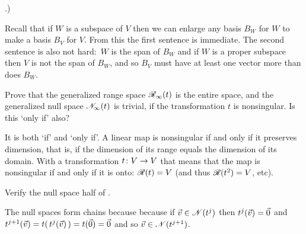 \begin{exercises}
{             .)}
    \begin{answer}
      Recall that if $W$ is a subspace of $V$ then we can enlarge
      any basis $B_W$ for $W$
      to make a basis $B_V$ for $V$.
      From this the first sentence is immediate.
      The second sentence is also not hard:~$W$ is the span of $B_W$ and
      if $W$ is a proper subspace then $V$ is not the span of $B_W$, and
      so $B_V$ must have at least one vector more than does $B_W$.     
    \end{answer}
  \recommended\item 
    Prove that the generalized range space $\mathscr{R}_\infty(t)$ is the
    entire space, and the generalized null space $\mathscr{N}_\infty(t)$ is trivial,
    if the transformation $t$ is nonsingular.
    Is this `only if' also?
    \begin{answer}
      It is both `if' and `only if'.
      A linear map is nonsingular
      if and only if it preserves dimension, that is, if the dimension of 
      its range equals the dimension of its domain.
      With a transformation $\mbox{$t\colon V\to V$}$ that means that 
      the map is nonsingular if and only if it is onto:
      $\mathscr{R}(t)=V$ (and thus $\mathscr{R}(t^2)=V$, etc).
    \end{answer}
  \item \label{exer:RangeAndNullChains} 
    Verify the null space half of .
    \begin{answer}
      The null spaces form chains because
      because if $\vec{v}\in\mathscr{N}(t^j)$ then $t^j(\vec{v})=\vec{0}$
      and $t^{j+1}(\vec{v})=t(\,t^j(\vec{v})\,)=t(\vec{0})=\vec{0}$ and
      so $\vec{v}\in\mathscr{N}(t^{j+1})$.


\end{answer}
\end{exercises}
